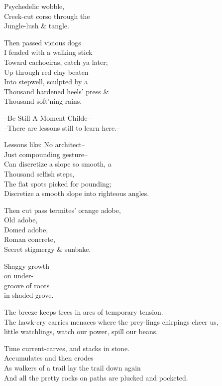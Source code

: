 Psychedelic wobble, \\
Creek-cut corso through the \\
Jungle-lush \& tangle.

Then passed vicious dogs \\
I fended with a walking stick \\
Toward cachoeiras, catch ya later; \\
Up through red clay beaten \\
Into stepwell, sculpted by a \\
Thousand hardened heels' press \& \\
Thousand soft'ning rains.

--Be Still A Moment Childe-- \\
--There are lessons still to learn here.--

Lessons like: No architect--\\
Just compounding gesture-- \\
Can discretize a slope so smooth, a \\
Thousand selfish steps, \\
The flat spots picked for pounding; \\
Discretize a smooth slope into righteous angles.

Then cut pass termites' orange adobe, \\
Old adobe, \\
Domed adobe, \\
Roman concrete, \\
Secret stigmergy \& sunbake.

\secdiv


Shaggy growth \\
on under- \\
groove of roots \\
in shaded grove.

The breeze keeps trees in arcs of temporary tension. \\
The hawk-cry carries menaces where the prey-lings chirpings cheer us, \\
little watchlings, watch our power, spill our beans.

Time current-carves, and stacks in stone. \\
Accumulates and then erodes \\
As walkers of a trail lay the trail down again \\
And all the pretty rocks on paths are plucked and pocketed. 

\secdiv

